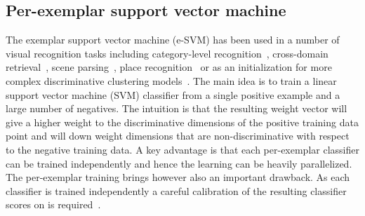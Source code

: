 \documentclass[table]{article} %
\begin{document}


\vspace{-3mm}
\subsection*{Per-exemplar support vector machine} \vspace{-3mm}
    The exemplar support vector machine (e-SVM) has been used in a number of visual recognition tasks including
    category-level recognition~\cite{Malisiewicz11}, cross-domain retrieval~\cite{Shrivastava11}, scene parsing~\cite{Tighe13}, %
    place recognition~\cite{Gronat13} or as an initialization  for more complex discriminative clustering models~\cite{Doersch12,Singh12}. The main idea is to train a linear support vector machine (SVM) classifier from a single positive example and a large number of negatives. The intuition is that the resulting weight vector will give a higher weight to the discriminative dimensions of the positive training data point and will down weight dimensions that are non-discriminative with respect to the negative training data. A key advantage is that each per-exemplar classifier can be trained independently and hence the learning can be heavily parallelized. 
    The per-exemplar training brings however also an important drawback. As each classifier is trained independently a
    careful calibration of the resulting classifier scores on is required~\cite{Gronat13,Malisiewicz11}. 

%
\end{document}
